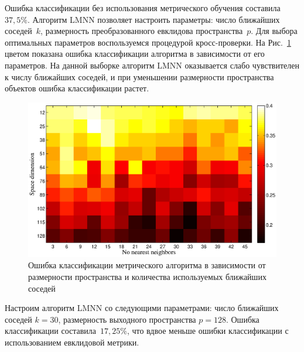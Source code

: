 	Ошибка классификации без использования метрического обучения составила~$37,5\%$.
	Алгоритм LMNN позволяет настроить параметры: число ближайших соседей~$k$,
	размерность преобразованного евклидова пространства~$p$.
	Для выбора оптимальных параметров воспользуемся процедурой кросс-проверки.
	На Рис.~\ref{ch5:fig:heat_map} цветом показана ошибка классификации алгоритма в зависимости от его параметров.
	На данной выборке алгоритм LMNN оказывается слабо чувствителен к числу ближайших соседей,
	и при уменьшении размерности пространства объектов ошибка классификации растет.
	\begin{figure}[!ht]
		\centering
		\includegraphics[width=1\linewidth]{figs/ch5/heat_map}
		\caption{Ошибка классификации метрического алгоритма в зависимости от размерности пространства и количества используемых ближайших соседей}
		\label{ch5:fig:heat_map}
	\end{figure}
	
	Настроим алгоритм LMNN со следующими параметрами: число ближайших соседей $k = 30$, размерность
	выходного пространства $p = 128$.
	Ошибка классификации составила~$17,25\%$, что вдвое меньше ошибки классификации с использованием евклидовой метрики.
	
